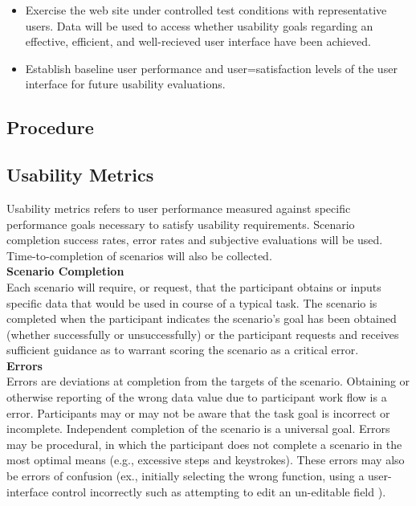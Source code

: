 \documentclass[10pt]{article}
\begin{document}
\begin{multicols}{2}
\begin{itemize}
\item Exercise the web site under controlled test conditions with representative users. Data will be used to access whether usability goals regarding an effective, efficient, and well-recieved user interface have been achieved.

\item Establish baseline user performance and user=satisfaction levels of the user interface for future usability evaluations.
\end{itemize}

\subsection*{Procedure}
\subsection*{Usability Metrics}
Usability metrics refers to user performance measured against specific performance goals necessary to satisfy usability requirements. Scenario completion success rates, error rates and subjective evaluations will be used. Time-to-completion of scenarios will also be collected.\\

\textbf{Scenario Completion}\\
Each scenario will require, or request, that the participant obtains or inputs specific data that would be used in course of a typical task. The scenario is completed when the participant indicates the scenario's goal has been obtained (whether successfully or unsuccessfully) or the participant requests and receives sufficient guidance as to warrant scoring the scenario as a critical error.\\

\textbf{Errors}\\
Errors are deviations at completion from the targets of the scenario. Obtaining or otherwise reporting of the wrong data value due to participant work flow is a error. Participants may or may not be aware that the task goal is incorrect or incomplete.
Independent completion of the scenario is a universal goal. Errors may be procedural, in which the participant does not complete a scenario in the most optimal means (e.g., excessive steps and keystrokes). These errors may also be errors of confusion (ex., initially selecting the wrong function, using a user-interface control incorrectly such as attempting to edit an un-editable field ).\\


\end{multicols}
\end{document}
